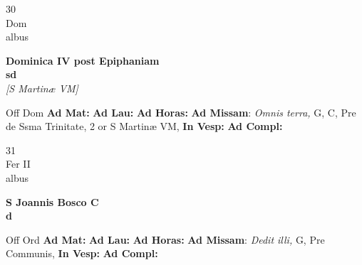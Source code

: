 \documentclass[10pt, openany]{book}
\begin{document}
        \begin{center}
            \begin{minipage}{3.5in}
                \vspace{2em}
                \begin{minipage}{0.5in}
                    {\Huge 30} \\
                    {\normalsize Dom} \\
                    {\normalsize albus}
                \end{minipage}
                \begin{minipage}{3.0in}
                    \textbf{ \large Dominica IV post Epiphaniam \\
                    \textnormal{\normalsize sd}} \\ \textit{[S Martinæ VM]} \\ 
                \end{minipage}
                \begin{justify}Off Dom
                    \textbf{Ad Mat: }
                    \textbf{Ad Lau: }
                    \textbf{Ad Horas: }\textbf{Ad Missam}: \textit{Omnis terra,} G, C, Pre de Ssma Trinitate, 2 or S Martinæ VM,  
                    \textbf{In Vesp: }
                    \textbf{Ad Compl: }
                \end{justify}
            \end{minipage}
        \end{center}
    
        \begin{center}
            \begin{minipage}{3.5in}
                \vspace{2em}
                \begin{minipage}{0.5in}
                    {\Huge 31} \\
                    {\normalsize Fer II} \\
                    {\normalsize albus}
                \end{minipage}
                \begin{minipage}{3.0in}
                    \textbf{ \large S Joannis Bosco C \\
                    \textnormal{\normalsize d}} \\ 
                \end{minipage}
                \begin{justify}Off Ord
                    \textbf{Ad Mat: }
                    \textbf{Ad Lau: }
                    \textbf{Ad Horas: }\textbf{Ad Missam}: \textit{Dedit illi,} G, Pre Communis,  
                    \textbf{In Vesp: }
                    \textbf{Ad Compl: }
                \end{justify}
            \end{minipage}
        \end{center}
    
\end{document}

